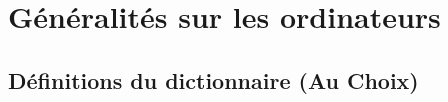 
\chapter{Généralités sur les ordinateurs}

\setcounter{section}{1} %
\section{Définitions du dictionnaire (Au Choix)}


